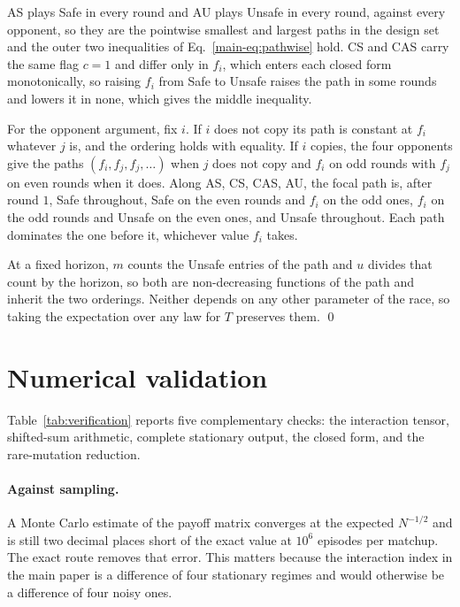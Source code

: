 \documentclass[a4paper,fleqn]{cas-sc}
\newcommand{\AS}{\textsf{AS}}
\newcommand{\CS}{\textsf{CS}}
\newcommand{\CAS}{\textsf{CAS}}
\newcommand{\AU}{\textsf{AU}}
\begin{document}
\AS{} plays Safe in every round and \AU{} plays Unsafe in every round, against
every opponent, so they are the pointwise smallest and largest paths in the
design set and the outer two inequalities of Eq.~\eqref{main-eq:pathwise} hold.
\CS{} and \CAS{} carry the same flag $c=1$ and differ only in $f_{i}$, which
enters each closed form monotonically, so raising $f_{i}$ from Safe to Unsafe
raises the path in some rounds and lowers it in none, which gives the middle
inequality.

For the opponent argument, fix $i$. If $i$ does not copy its path is constant
at $f_{i}$ whatever $j$ is, and the ordering holds with equality. If $i$
copies, the four opponents give the paths $(f_{i},f_{j},f_{j},\dots)$ when $j$
does not copy and $f_{i}$ on odd rounds with $f_{j}$ on even rounds when it
does. Along \AS{}, \CS{}, \CAS{}, \AU{}, the focal path is, after round $1$,
Safe throughout, Safe on the even rounds and $f_{i}$ on the odd ones, $f_{i}$
on the odd rounds and Unsafe on the even ones, and Unsafe throughout. Each path
dominates the one before it, whichever value $f_{i}$ takes.

At a fixed horizon, $m$ counts the Unsafe entries of the path and $u$ divides
that count by the horizon, so both are non-decreasing functions of the path and
inherit the two orderings. Neither depends on any other parameter of the race,
so taking the expectation over any law for $T$ preserves them. \qed

\section{Numerical validation}
\label{supp:verification}

Table~\ref{tab:verification} reports five complementary checks: the interaction
tensor, shifted-sum arithmetic, complete stationary output, the closed form,
and the rare-mutation reduction.



\paragraph{Against sampling.}
A Monte Carlo estimate of the payoff matrix converges at the expected
$N^{-1/2}$ and is still two decimal places short of the exact value at
$10^{6}$ episodes per matchup. The exact route removes that error. This matters
because the interaction index in the main paper is a difference of four
stationary regimes and would otherwise be a difference of four noisy ones.
\end{document}

